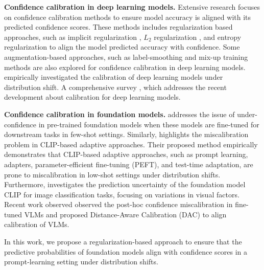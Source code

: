 \noindent\textbf{Confidence calibration in deep learning models.}
Extensive research focuses on confidence calibration methods to ensure model accuracy is aligned with its predicted confidence scores. These methods includes regularization based approaches, such as implicit regularization \cite{ross2017focal} \cite{baloch2019focused}, \(L_{2}\) regularization \cite{guo2017calibration} , and entropy regularization \cite{pereyra2017regularizing} to align the model predicted accuracy with confidence. Some augmentation-based approaches, such as label-smoothing \cite{muller2019does} and mix-up training methods \cite{thulasidasan2019mixup, zhang2022and} are also explored for confidence calibration in deep learning models. 
\cite{ovadia2019can} empirically investigated the calibration of deep learning models under distribution shift. A comprehensive survey \cite{wang2023calibration}, which addresses the recent development about calibration for deep learning models. 


\noindent\textbf{Confidence calibration in foundation models.}
\cite{pandeyconfident} addresses the issue of under-confidence in pre-trained foundation models when these models are fine-tuned for downstream tasks in few-shot settings. Similarly, \cite{murugesan2025robust} highlights the miscalibration problem in CLIP-based adaptive approaches. Their proposed method empirically demonstrates that CLIP-based adaptive approaches, such as prompt learning, adapters, parameter-efficient fine-tuning (PEFT), and test-time adaptation, are prone to miscalibration in low-shot settings under distribution shifts. Furthermore, \cite{tu2024toward} investigates the prediction uncertainty of the foundation model CLIP for image classification tasks, focusing on variations in visual factors. Recent work \cite{wangopen} observed observed the post-hoc confidence miscalibration in fine-tuned VLMs and proposed Distance-Aware Calibration (DAC) to align calibration of VLMs.  


In this work, we propose a regularization-based approach to ensure that the predictive probabilities of foundation models align with confidence scores in a prompt-learning setting under distribution shifts.